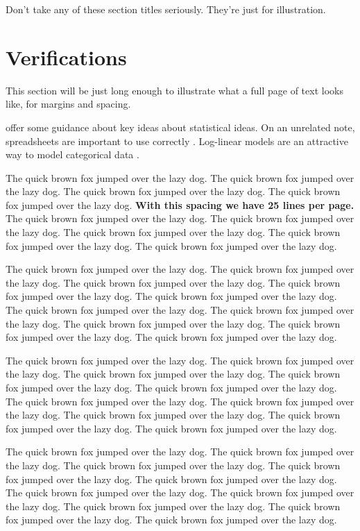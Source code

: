 \documentclass[
  12pt]{article}
\begin{document}
Don't take any of these section titles seriously. They're just for
illustration.

\hypertarget{sec-verify}{%
\section{Verifications}\label{sec-verify}}

This section will be just long enough to illustrate what a full page of
text looks like, for margins and spacing.

\addtolength{\textheight}{.5in}%

\citet{gelm:veht:2021} offer some guidance about key ideas about
statistical ideas. On an unrelated note, spreadsheets are important to
use correctly \citep{brom:woo:2018}. Log-linear models are an attractive
way to model categorical data \citep{bish:fien:1975}.

The quick brown fox jumped over the lazy dog. The quick brown fox jumped
over the lazy dog. The quick brown fox jumped over the lazy dog. The
quick brown fox jumped over the lazy dog. \textbf{With this spacing we
have 25 lines per page.} The quick brown fox jumped over the lazy dog.
The quick brown fox jumped over the lazy dog. The quick brown fox jumped
over the lazy dog. The quick brown fox jumped over the lazy dog. The
quick brown fox jumped over the lazy dog.

The quick brown fox jumped over the lazy dog. The quick brown fox jumped
over the lazy dog. The quick brown fox jumped over the lazy dog. The
quick brown fox jumped over the lazy dog. The quick brown fox jumped
over the lazy dog. The quick brown fox jumped over the lazy dog. The
quick brown fox jumped over the lazy dog. The quick brown fox jumped
over the lazy dog. The quick brown fox jumped over the lazy dog. The
quick brown fox jumped over the lazy dog.

The quick brown fox jumped over the lazy dog. The quick brown fox jumped
over the lazy dog. The quick brown fox jumped over the lazy dog. The
quick brown fox jumped over the lazy dog. The quick brown fox jumped
over the lazy dog. The quick brown fox jumped over the lazy dog. The
quick brown fox jumped over the lazy dog. The quick brown fox jumped
over the lazy dog. The quick brown fox jumped over the lazy dog. The
quick brown fox jumped over the lazy dog.

The quick brown fox jumped over the lazy dog. The quick brown fox jumped
over the lazy dog. The quick brown fox jumped over the lazy dog. The
quick brown fox jumped over the lazy dog. The quick brown fox jumped
over the lazy dog. The quick brown fox jumped over the lazy dog. The
quick brown fox jumped over the lazy dog. The quick brown fox jumped
over the lazy dog. The quick brown fox jumped over the lazy dog. The
quick brown fox jumped over the lazy dog.
\end{document}
